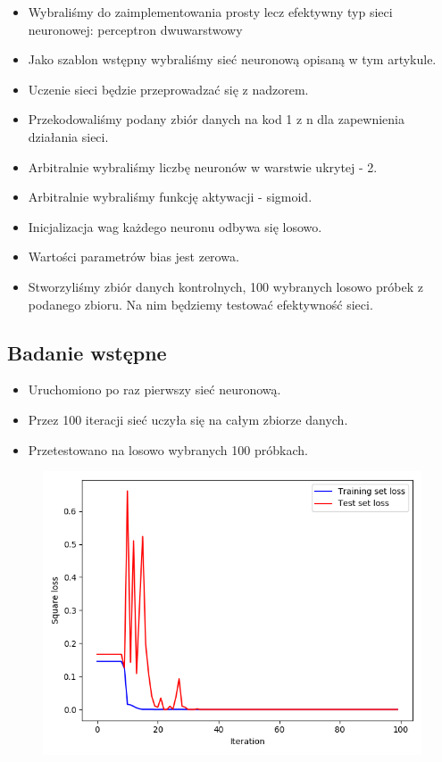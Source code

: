 \documentclass[12pt,a4paper]{article}
\begin{document}
\begin{itemize}
	\item 	Wybraliśmy do zaimplementowania prosty lecz efektywny typ sieci neuronowej: perceptron dwuwarstwowy
  \item 	Jako szablon wstępny wybraliśmy sieć neuronową opisaną w tym artykule.
  \item 	Uczenie sieci będzie przeprowadzać się z nadzorem.
  \item 	Przekodowaliśmy podany zbiór danych na kod 1 z n dla zapewnienia działania sieci.
  \item	Arbitralnie wybraliśmy liczbę neuronów w warstwie ukrytej - 2.
  \item 	Arbitralnie wybraliśmy funkcję aktywacji - sigmoid.
  \item 	Inicjalizacja wag każdego neuronu odbywa się losowo.
  \item 	Wartości parametrów bias jest zerowa.
  \item 	Stworzyliśmy zbiór danych kontrolnych, 100 wybranych losowo próbek z podanego zbioru. Na nim będziemy testować efektywność sieci.

\end{itemize}

\pagebreak
\subsection{Badanie wstępne}

\begin{itemize}
	\item 	Uruchomiono po raz pierwszy sieć neuronową.
  \item	Przez 100 iteracji sieć uczyła się na całym zbiorze danych.
  \item 	Przetestowano na losowo wybranych 100 próbkach.
\end{itemize}

\begin{figure}[h]
  \centering
  \includegraphics[width=1.0\textwidth]{charts/double_activation/first_chart.png}
  \caption{}
  \label{}
\end{figure}
\end{document}

